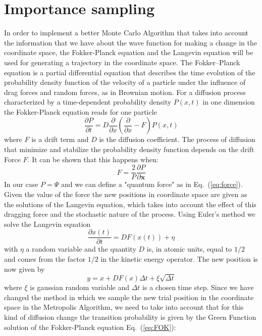 \documentclass[10pt,a4paper,titlepage]{article}
\begin{document}
\section*{Importance sampling}
\noindent In order to implement a better Monte Carlo Algorithm that takes into account the information that we have about the wave function for making a change in the coordinate space, the Fokker-Planck equation and the Langevin equation will be used for generating a trajectory in the coordinate space.
The Fokker–Planck equation is a partial differential equation that describes the time evolution of the probability density function of the velocity of a particle under the influence of drag forces and random forces, as in Brownian motion.
For a diffusion process characterized by a time-dependent probability density $P(x,t)$ in one dimension the Fokker-Planck equation reads for one particle
\begin{equation}
   \frac{\partial P}{\partial t} = D\frac{\partial }{\partial x}\left(\frac{\partial }{\partial x} -F\right)P(x,t)
   \label{eq:FOK}
\end{equation}
where $F$ is a drift term and $D$ is the diffusion coefficient.
The process of diffusion that minimize and stabilize the probability density function depends on the drift Force $F$. It can be shown that this happens when:
\begin{equation}
F = \frac{2}{P}\frac{\partial P}{\partial \mathbf{x}}
\label{eq:force}
\end{equation}
In our case $P=\Psi$ and we can define a "quantum force" as in Eq.~(\ref{eq:force}). Given the value of the force the new positions in coordinate space are given as the solutions of the Langevin equation, which takes into account the effect of this dragging force and the stochastic nature of the process. Using Euler's method we solve the Langevin equation
\begin{equation}
   \frac{\partial x(t)}{\partial t} = DF(x(t)) +\eta
\end{equation}
with $\eta$ a random variable and the quantity $D$ is, in atomic units, equal to $1/2$ and comes from the factor $1/2$ in the kinetic energy operator. The new position is now given by 
\begin{equation}
 y = x+DF(x)\Delta t +\xi\sqrt{\Delta t}
\end{equation}
where $\xi$ is gaussian random variable and $\Delta t$ is a chosen time step. 
Since we have changed the method in which we sample the new trial position in the coordinate space in the Metropolis Algorithm, we need to take into account that for this kind of diffusion change the transition probability is given by the Green Function solution of the Fokker-Planck equation Eq.~(\ref{eq:FOK}):
\end{document}
